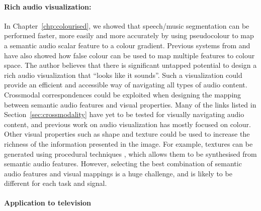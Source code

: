 \paragraph{Rich audio visualization:}

In Chapter~\ref{chp:colourised}, we showed that speech/music segmentation can be performed faster, more easily and more
accurately by using pseudocolour to map a semantic audio scalar feature to a colour gradient. Previous systems from
\citet{Tzanetakis2000} and \citet{Mason2007} have also showed how false colour can be used to map multiple features to
colour space.  The author believes that there is significant untapped potential to design a rich audio visualization
that ``looks like it sounds''. Such a visualization could provide an efficient and accessible way of navigating all
types of audio content.  Crossmodal correspondences could be exploited when designing the mapping between semantic
audio features and visual properties.  Many of the links listed in Section~\ref{sec:crossmodality} have yet to be
tested for visually navigating audio content, and previous work on audio visualization has mostly focused on colour.
Other visual properties such as shape and texture could be used to increase the richness of the information presented
in the image.  For example, textures can be generated using procedural techniques \citep{Ebert1994}, which allows them
to be synthesised from semantic audio features.  However, selecting the best combination of semantic audio features and
visual mappings is a huge challenge, and is likely to be different for each task and signal.



\paragraph{Application to television}

